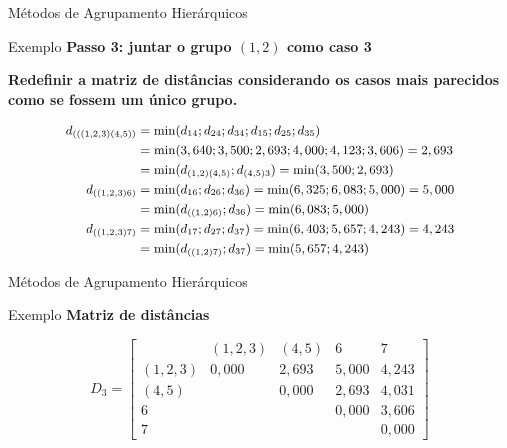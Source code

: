\documentclass[
  ignorenonframetext,
  aspectratio=169,
]{beamer}
\begin{document}
\begin{frame}{Métodos de Agrupamento Hierárquicos}
\protect{}\label{muxe9todos-de-agrupamento-hieruxe1rquicos-22}
\begin{block}{Exemplo}
\protect{}\label{exemplo-11}
\textbf{Passo 3: juntar o grupo \((1,2)\) como caso 3}

\textbf{Redefinir a matriz de distâncias considerando os casos mais
parecidos como se fossem um único grupo.}

\[ \small
\begin{aligned}
d_{(((1,2,3)(4,5))} &=  \min(d_{14};d_{24};d_{34};d_{15};d_{25};d_{35}) \\ &= \min(3,640; 3,500; 2,693; 4,000; 4,123; 3,606) = 2,693 \\ &= 
\min(d_{(1,2)(4,5)};d_{(4,5)3}) = \min(3,500;2,693) \\
d_{((1,2,3)6)} &= \min(d_{16};d_{26};d_{36}) =  \min(6,325; 6,083; 5,000) = 5,000 \\ &=  \min(d_{((1,2)6)};d_{36}) = \min(6,083;5,000) \\
d_{((1,2,3)7)} &= \min(d_{17};d_{27};d_{37}) =  \min(6,403; 5,657; 4,243) = 4,243 \\ &=  \min(d_{((1,2)7)};d_{37}) = \min(5,657;4,243) \\ 
\end{aligned}
\]
\end{block}
\end{frame}

\begin{frame}{Métodos de Agrupamento Hierárquicos}
\protect{}\label{muxe9todos-de-agrupamento-hieruxe1rquicos-23}
\begin{block}{Exemplo}
\protect{}\label{exemplo-12}
\textbf{Matriz de distâncias}

\[D_3 = \left[ \begin{matrix}
&(1,2,3) &(4,5)&6&7\\ 
(1,2,3)& 0,000 & 2,693 & 5,000 & 4,243 \\
(4,5)    &  & 0,000 &  2,693 & 4,031 \\
6  &     &  & 0,000 & 3,606 \\
7  &      &  &  & 0,000
                    \end{matrix} \right]\]
\end{block}
\end{frame}
\end{document}
